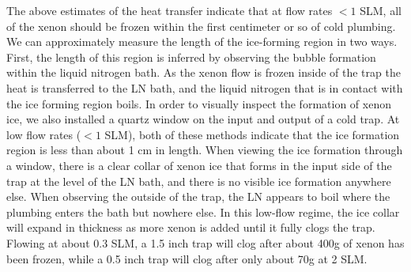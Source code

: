 The above estimates of the heat transfer indicate that at flow rates $<1$ SLM, all of the xenon should be frozen within the first centimeter or so of cold plumbing. We can approximately measure the length of the ice-forming region in two ways. First, the length of this region is inferred by observing the bubble formation within the liquid nitrogen bath. As the xenon flow is frozen inside of the trap the heat is transferred to the LN bath, and the liquid nitrogen that is in contact with the ice forming region boils. In order to visually inspect the formation of xenon ice, we also installed a quartz window on the input and output of a cold trap. At low flow rates ($<1$ SLM), both of these methods indicate that the ice formation region is less than about 1 cm in length. When viewing the ice formation through a window, there is a clear collar of xenon ice that forms in the input side of the trap at the level of the LN bath, and there is no visible ice formation anywhere else. When observing the outside of the trap, the LN appears to boil where the plumbing enters the bath but nowhere else. In this low-flow regime, the ice collar will expand in thickness as more xenon is added until it fully clogs the trap. Flowing at about 0.3 SLM, a 1.5 inch trap will clog after about 400g of xenon has been frozen, while a 0.5 inch trap will clog after only about 70g at 2 SLM.
